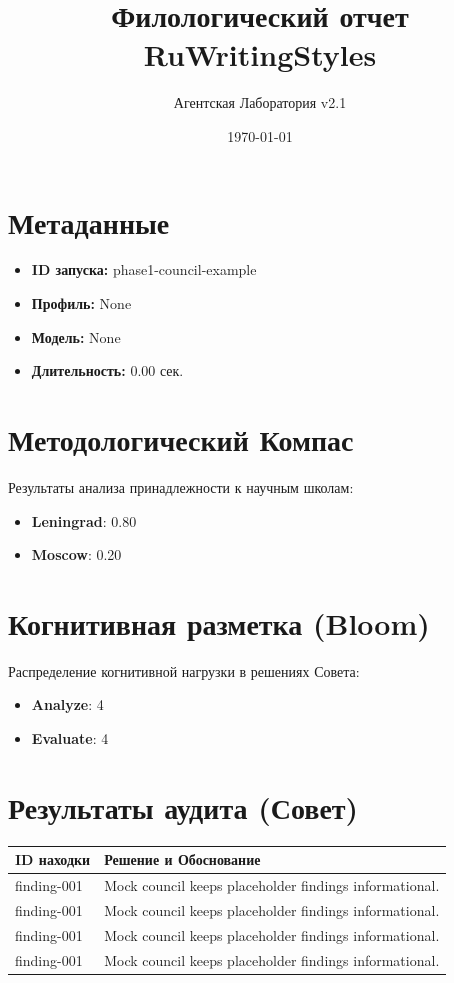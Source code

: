\documentclass{article}
\title{Филологический отчет RuWritingStyles}
\author{Агентская Лаборатория v2.1}
\date{\today}
\begin{document}
\maketitle

\section{Метаданные}
\begin{itemize}
    \item \textbf{ID запуска:} phase1-council-example
    \item \textbf{Профиль:} None
    \item \textbf{Модель:} None
    \item \textbf{Длительность:} 0.00 сек.
\end{itemize}

\section{Методологический Компас}
Результаты анализа принадлежности к научным школам:
\begin{itemize}
    \item \textbf{{Leningrad}}: 0.80
    \item \textbf{{Moscow}}: 0.20
\end{itemize}

\section{Когнитивная разметка (Bloom)}
Распределение когнитивной нагрузки в решениях Совета:
\begin{itemize}
    \item \textbf{{Analyze}}: 4
    \item \textbf{{Evaluate}}: 4
\end{itemize}

\section{Результаты аудита (Совет)}
\begin{longtable}{@{}p{}p{}@{}}
\toprule
\textbf{ID находки} & \textbf{Решение и Обоснование} \\
\midrule
finding-001 & Mock council keeps placeholder findings informational. \\ \hline
finding-001 & Mock council keeps placeholder findings informational. \\ \hline
finding-001 & Mock council keeps placeholder findings informational. \\ \hline
finding-001 & Mock council keeps placeholder findings informational. \\ \hline

\bottomrule
\end{longtable}
\end{document}
